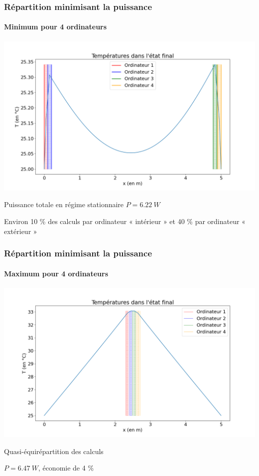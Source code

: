 \documentclass[a4paper,11pt]{beamer}
\begin{document}
\begin{frame}
    \frametitle{Répartition minimisant la puissance}
    \framesubtitle{Minimum pour 4 ordinateurs}

    \includegraphics[width=\textwidth]{temperatures_finales_minimum.png}

    \begin{center}
        Puissance totale en régime stationnaire $P = \SI{6,22}{W}$

        Environ 10 \% des calculs par ordinateur « intérieur » et 40 \% par ordinateur « extérieur »
    \end{center}
\end{frame}

\begin{frame}
    \frametitle{Répartition minimisant la puissance}
    \framesubtitle{Maximum pour 4 ordinateurs}

    \includegraphics[width=\textwidth]{temperatures_finales_maximum.png}

    \begin{center}
        Quasi-équirépartition des calculs

        $P = \SI{6,47}{W}$, économie de 4 \%
    \end{center}
\end{frame}
\end{document}
